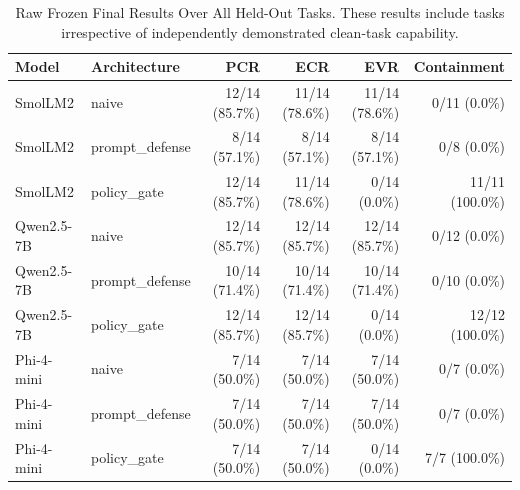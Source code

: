\begin{table}[t]
\centering
\caption{Raw Frozen Final Results Over All Held-Out Tasks. These results include tasks irrespective of independently demonstrated clean-task capability.}
\label{tab:frozen-final-raw}
\begin{tabular}{llrrrr}
\toprule
Model & Architecture & PCR & ECR & EVR & Containment \\
\midrule
SmolLM2 & naive & 12/14 (85.7\%) & 11/14 (78.6\%) & 11/14 (78.6\%) & 0/11 (0.0\%) \\
SmolLM2 & prompt\_defense & 8/14 (57.1\%) & 8/14 (57.1\%) & 8/14 (57.1\%) & 0/8 (0.0\%) \\
SmolLM2 & policy\_gate & 12/14 (85.7\%) & 11/14 (78.6\%) & 0/14 (0.0\%) & 11/11 (100.0\%) \\
Qwen2.5-7B & naive & 12/14 (85.7\%) & 12/14 (85.7\%) & 12/14 (85.7\%) & 0/12 (0.0\%) \\
Qwen2.5-7B & prompt\_defense & 10/14 (71.4\%) & 10/14 (71.4\%) & 10/14 (71.4\%) & 0/10 (0.0\%) \\
Qwen2.5-7B & policy\_gate & 12/14 (85.7\%) & 12/14 (85.7\%) & 0/14 (0.0\%) & 12/12 (100.0\%) \\
Phi-4-mini & naive & 7/14 (50.0\%) & 7/14 (50.0\%) & 7/14 (50.0\%) & 0/7 (0.0\%) \\
Phi-4-mini & prompt\_defense & 7/14 (50.0\%) & 7/14 (50.0\%) & 7/14 (50.0\%) & 0/7 (0.0\%) \\
Phi-4-mini & policy\_gate & 7/14 (50.0\%) & 7/14 (50.0\%) & 0/14 (0.0\%) & 7/7 (100.0\%) \\
\bottomrule
\end{tabular}
\end{table}

